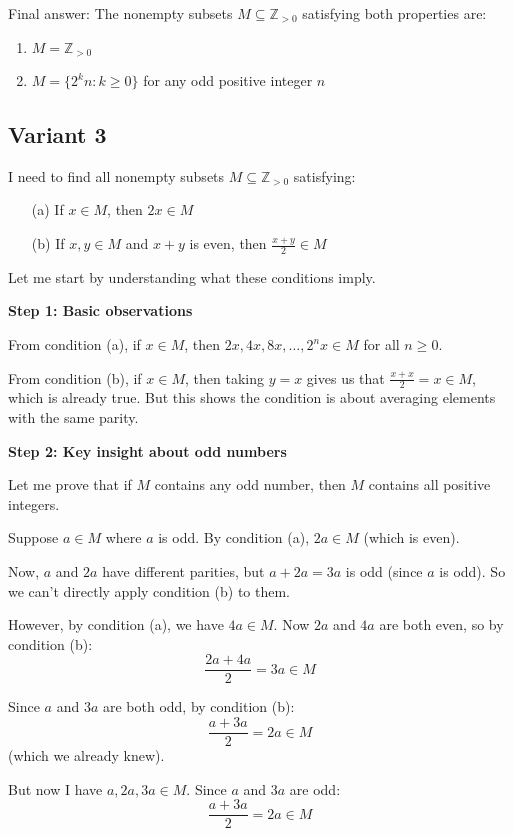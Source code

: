 \documentclass[12pt,a4paper]{article}
\theoremstyle{definition}
\begin{document}
    Final answer: The nonempty subsets $M \subseteq \mathbb{Z}_{>0}$ satisfying both properties are:
    \begin{enumerate}
        \item $M = \mathbb{Z}_{>0}$
        \item $M = \{2^k n : k \geq 0\}$ for any odd positive integer $n$
    \end{enumerate}
\subsection{Variant 3}
        I need to find all nonempty subsets $M \subseteq \mathbb{Z}_{>0}$ satisfying:
        \begin{itemize}
            \item[(a)] If $x \in M$, then $2x \in M$
            \item[(b)] If $x,y \in M$ and $x + y$ is even, then $\frac{x + y}{2} \in M$
        \end{itemize}

        Let me start by understanding what these conditions imply.

        \textbf{Step 1: Basic observations}

        From condition (a), if $x \in M$, then $2x, 4x, 8x, \ldots, 2^n x \in M$ for all $n \geq 0$.

        From condition (b), if $x \in M$, then taking $y = x$ gives us that $\frac{x + x}{2} = x \in M$, which is already true. But this shows the condition is about averaging elements with the same parity.

        \textbf{Step 2: Key insight about odd numbers}

        Let me prove that if $M$ contains any odd number, then $M$ contains all positive integers.

        Suppose $a \in M$ where $a$ is odd. By condition (a), $2a \in M$ (which is even).

        Now, $a$ and $2a$ have different parities, but $a + 2a = 3a$ is odd (since $a$ is odd). So we can't directly apply condition (b) to them.

        However, by condition (a), we have $4a \in M$. Now $2a$ and $4a$ are both even, so by condition (b):
        $$\frac{2a + 4a}{2} = 3a \in M$$

        Since $a$ and $3a$ are both odd, by condition (b):
        $$\frac{a + 3a}{2} = 2a \in M$$
        (which we already knew).

        But now I have $a, 2a, 3a \in M$. Since $a$ and $3a$ are odd:
        $$\frac{a + 3a}{2} = 2a \in M$$
\end{document}

